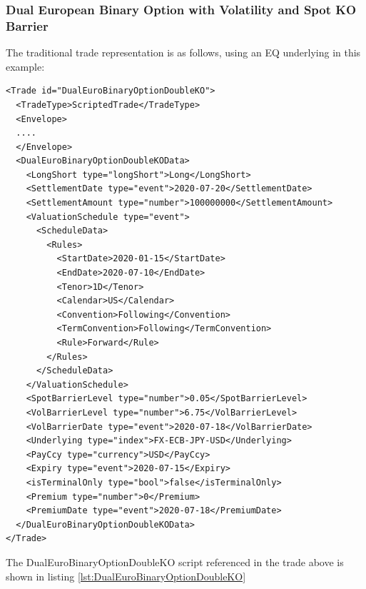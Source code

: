\subsubsection{Dual European Binary Option with Volatility and Spot KO Barrier}

The traditional trade representation is as follows, using an EQ underlying in this example:

\begin{verbatim}
<Trade id="DualEuroBinaryOptionDoubleKO">
  <TradeType>ScriptedTrade</TradeType>
  <Envelope>
  ....
  </Envelope>
  <DualEuroBinaryOptionDoubleKOData>
    <LongShort type="longShort">Long</LongShort>
    <SettlementDate type="event">2020-07-20</SettlementDate>
    <SettlementAmount type="number">100000000</SettlementAmount>
    <ValuationSchedule type="event">
      <ScheduleData>
        <Rules>
          <StartDate>2020-01-15</StartDate>
          <EndDate>2020-07-10</EndDate>
          <Tenor>1D</Tenor>
          <Calendar>US</Calendar>
          <Convention>Following</Convention>
          <TermConvention>Following</TermConvention>
          <Rule>Forward</Rule>
        </Rules>
      </ScheduleData>
    </ValuationSchedule>
    <SpotBarrierLevel type="number">0.05</SpotBarrierLevel>
    <VolBarrierLevel type="number">6.75</VolBarrierLevel>
    <VolBarrierDate type="event">2020-07-18</VolBarrierDate>
    <Underlying type="index">FX-ECB-JPY-USD</Underlying>
    <PayCcy type="currency">USD</PayCcy>
    <Expiry type="event">2020-07-15</Expiry>
    <isTerminalOnly type="bool">false</isTerminalOnly>
    <Premium type="number">0</Premium>
    <PremiumDate type="event">2020-07-18</PremiumDate>
  </DualEuroBinaryOptionDoubleKOData>
</Trade>
\end{verbatim}

The DualEuroBinaryOptionDoubleKO script referenced in the trade above is shown in listing
\ref{lst:DualEuroBinaryOptionDoubleKO}

